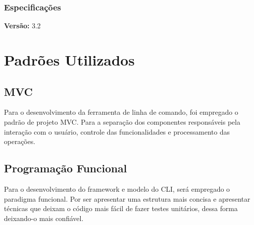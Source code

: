 \subsubsection{Especificações}
\textbf{Versão: } 3.2

\section{Padrões Utilizados}
\subsection{MVC}
\par Para o desenvolvimento da ferramenta de linha de comando, foi empregado o padrão de projeto MVC.  
Para a separação dos componentes responsáveis pela interação com o usuário, controle das funcionalidades e processamento das operações.
\subsection{Programação Funcional}
\par Para o desenvolvimento do framework e modelo do CLI, será empregado o paradigma funcional. Por ser apresentar uma estrutura mais 
concisa e apresentar técnicas que deixam o código mais fácil de fazer testes unitários, dessa forma deixando-o mais confiável.

